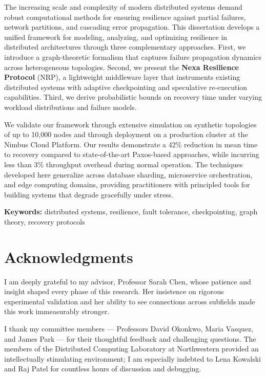 \documentclass[12pt,letterpaper,oneside]{report}
\begin{document}
The increasing scale and complexity of modern distributed systems demand robust computational methods for ensuring resilience against partial failures, network partitions, and cascading error propagation. This dissertation develops a unified framework for modeling, analyzing, and optimizing resilience in distributed architectures through three complementary approaches. First, we introduce a graph-theoretic formalism that captures failure propagation dynamics across heterogeneous topologies. Second, we present the \textbf{Nexa Resilience Protocol} (NRP), a lightweight middleware layer that instruments existing distributed systems with adaptive checkpointing and speculative re-execution capabilities. Third, we derive probabilistic bounds on recovery time under varying workload distributions and failure models.

We validate our framework through extensive simulation on synthetic topologies of up to 10,000 nodes and through deployment on a production cluster at the Nimbus Cloud Platform. Our results demonstrate a 42\% reduction in mean time to recovery compared to state-of-the-art Paxos-based approaches, while incurring less than 3\% throughput overhead during normal operation. The techniques developed here generalize across database sharding, microservice orchestration, and edge computing domains, providing practitioners with principled tools for building systems that degrade gracefully under stress.

\vspace{20pt}
\noindent\textbf{Keywords:} distributed systems, resilience, fault tolerance, checkpointing, graph theory, recovery protocols

\chapter*{Acknowledgments}

I am deeply grateful to my advisor, Professor Sarah Chen, whose patience and insight shaped every phase of this research. Her insistence on rigorous experimental validation and her ability to see connections across subfields made this work immeasurably stronger.

I thank my committee members --- Professors David Okonkwo, Maria Vasquez, and James Park --- for their thoughtful feedback and challenging questions. The members of the Distributed Computing Laboratory at Northwestern provided an intellectually stimulating environment; I am especially indebted to Lena Kowalski and Raj Patel for countless hours of discussion and debugging.
\end{document}
